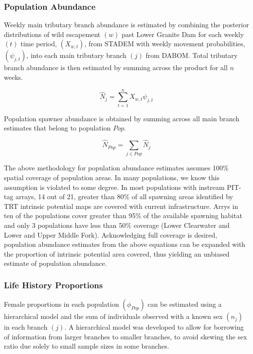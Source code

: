 \documentclass[]{article}
\begin{document}
\hypertarget{population-abundance}{%
\subsubsection{Population Abundance}\label{population-abundance}}

Weekly main tributary branch abundance is estimated by combining the
posterior distributions of wild escapement \((w)\) past Lower Granite
Dam for each weekly \((t)\) time period, \((X_{w,t})\), from STADEM with
weekly movement probabilities, \((\psi_{j,t})\), into each main
tributary branch \((j)\) from DABOM. Total tributary branch abundance is
then estimated by summing across the product for all \(n\) weeks.

\[
\hat{N}_{j} = \sum^{n}_{t=1} X_{w,t} \psi_{j,t}
\]

Population spawner abundance is obtained by summing across all main
branch estimates that belong to population \(Pop\).

\[
\hat{N}_{Pop} = \sum_{j \in Pop} \hat{N}_{j}
\]

The above methodology for population abundance estimates assumes 100\%
spatial coverage of population areas. In many populations, we know this
assumption is violated to some degree. In most populations with instream
PIT-tag arrays, 14 out of 21, greater than 80\% of all spawning areas
identified by TRT intrinsic potential maps are covered with current
infrastructure. Arrys in ten of the populations cover greater than 95\%
of the available spawning habitat and only 3 populations have less than
50\% coverage (Lower Clearwater and Lower and Upper Middle Fork).
Acknowledging full coverage is desired, population abundance estimates
from the above equations can be expanded with the proportion of
intrinsic potential area covered, thus yielding an unbiased estimate of
population abundance.

\hypertarget{life-history-proportions}{%
\subsubsection{Life History
Proportions}\label{life-history-proportions}}

Female proportions in each population \((\phi_{Pop})\) can be estimated
using a hierarchical model and the sum of individuals observed with a
known sex \((n_j)\) in each branch \((j)\). A hierarchical model was
developed to allow for borrowing of information from larger branches to
smaller branches, to avoid skewing the sex ratio due solely to small
sample sizes in some branches.
\end{document}
